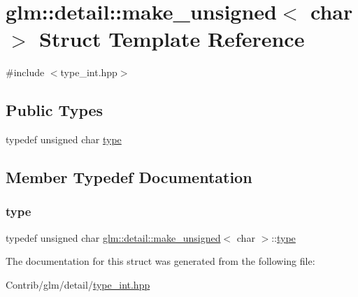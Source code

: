 \hypertarget{structglm_1_1detail_1_1make__unsigned_3_01char_01_4}{}\section{glm\+:\+:detail\+:\+:make\+\_\+unsigned$<$ char $>$ Struct Template Reference}
\label{structglm_1_1detail_1_1make__unsigned_3_01char_01_4}


{\ttfamily \#include $<$type\+\_\+int.\+hpp$>$}

\subsection*{Public Types}
\begin{DoxyCompactItemize}
\item 
typedef unsigned char \mbox{\hyperlink{structglm_1_1detail_1_1make__unsigned_3_01char_01_4_a473f89289be25f14bdc7c459e4be4fed}{type}}
\end{DoxyCompactItemize}


\subsection{Member Typedef Documentation}
\mbox{\label{structglm_1_1detail_1_1make__unsigned_3_01char_01_4_a473f89289be25f14bdc7c459e4be4fed}} 
\subsubsection{\texorpdfstring{type}{type}}
{\footnotesize\ttfamily typedef unsigned char \mbox{\hyperlink{structglm_1_1detail_1_1make__unsigned}{glm\+::detail\+::make\+\_\+unsigned}}$<$ char $>$\+::\mbox{\hyperlink{structglm_1_1detail_1_1make__unsigned_3_01char_01_4_a473f89289be25f14bdc7c459e4be4fed}{type}}}



The documentation for this struct was generated from the following file\+:\begin{DoxyCompactItemize}
\item 
Contrib/glm/detail/\mbox{\hyperlink{type__int_8hpp}{type\+\_\+int.\+hpp}}\end{DoxyCompactItemize}
